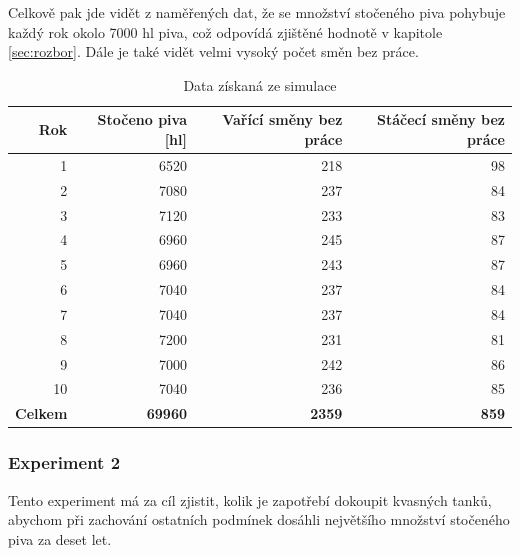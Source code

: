 \documentclass[11pt,a4paper]{article}
\begin{document}
Celkově pak jde vidět z naměřených dat, že se množství stočeného piva pohybuje každý rok okolo 7000 hl piva, což odpovídá zjištěné hodnotě v kapitole \ref{sec:rozbor}. Dále je také vidět velmi vysoký počet směn bez práce.
\begin{table}[h]
	\begin{center}
	\begin{tabular}{|r||r|r|r|}
	\hline
	\bfseries Rok & \bfseries Stočeno piva [hl] & \bfseries Vařící směny bez práce & \bfseries Stáčecí směny bez práce \\ \hline
	1 & 6520 & 218 & 98 \\ \hline
	2 & 7080 & 237 & 84 \\ \hline
	3 & 7120 & 233 & 83 \\ \hline
	4 & 6960 & 245 & 87 \\ \hline
	5 & 6960 & 243 & 87 \\ \hline
	6 & 7040 & 237 & 84 \\ \hline
	7 & 7040 & 237 & 84 \\ \hline
	8 & 7200 & 231 & 81 \\ \hline
	9 & 7000 & 242 & 86 \\ \hline
	10 & 7040 & 236 & 85 \\ \hline \hline
	\bfseries Celkem & \bfseries 69960 & \bfseries 2359 & \bfseries 859 \\ \hline
	\end{tabular}
	\caption{Data získaná ze simulace}
	\label{tab:exp1}
	\end{center}
\end{table}

\subsubsection{Experiment 2}
Tento experiment má za cíl zjistit, kolik je zapotřebí dokoupit kvasných tanků, abychom při zachování ostatních podmínek dosáhli největšího množství stočeného piva za deset let.
\end{document}
